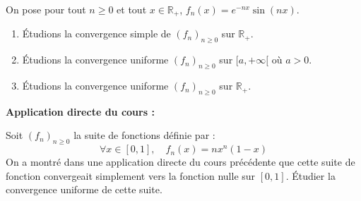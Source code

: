 \documentclass[french,11pt,twoside]{VcCours}
\newenvironment{ApplicationDirecte}{\textbf{Application directe du cours :}

}{}
\begin{document}
\medskip

\begin{Exemple} On pose pour tout $n \geq 0$ et tout $x \in \mathbb{R}_+$, $f_n(x)= e^{-nx} \sin(nx)$.

\begin{enumerate}
\item Étudions la convergence simple de $(f_n)_{n \geq 0}$ sur $\mathbb{R}_+$. 
%

\vspace*{7cm}
\item Étudions la convergence uniforme $(f_n)_{n \geq 0}$ sur $[a, + \infty[$ où $a>0$. 

\vspace*{7cm}
%
\item Étudions la convergence uniforme $(f_n)_{n \geq 0}$ sur $\mathbb{R}_+$. 

\vspace*{5cm}
\end{enumerate}
\end{Exemple}





\begin{ApplicationDirecte} Soit $(f_n)_{n \geq 0}$ la suite de fonctions définie par :
$$ \forall x \in [0,1], \quad f_n(x) = n x^n(1-x)$$
On a montré dans une application directe du cours précédente que cette suite de fonction convergeait simplement vers la fonction nulle sur $[0,1]$. Étudier la convergence uniforme de cette suite.
\end{ApplicationDirecte} 
\end{document}
